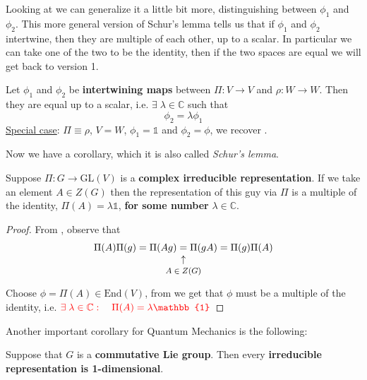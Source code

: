 \documentclass[../main.tex]{subfiles}
\begin{document}
Looking at  we can generalize it a little bit more, distinguishing between $\phi_1$ and $\phi_2$. This more general version of Schur's lemma tells us that if $\phi_1$ and $\phi_2$ intertwine, then they are multiple of each other, up to a scalar. In particular we can take one of the two to be the identity, then if the two spaces are equal we will get back to version 1.
\begin{theorem}
Let $\phi_1$ and $\phi_2$ be \textbf{intertwining maps} between $\Pi:V\to V$ and $\rho:W\to W$. Then they are equal up to a scalar, i.e. $\exists\;\lambda\in\mathbb{C}$ such that
\[
\phi_2=\lambda\phi_1
\]
\underline{Special case}: $\Pi\equiv \rho$, $V=W$, $\phi_1=\mathbb{1}$ and $\phi_2=\phi$, we recover .
\end{theorem}
Now we have a corollary, which it is also called \textit{Schur's lemma}.
\begin{corollary}
Suppose $\Pi:G\to\textrm{GL}(V)$ is a \textbf{complex irreducible representation}. If we take an element $A\in Z(G)$ then the representation of this guy via $\Pi$ is a multiple of the identity, $\Pi(A)=\lambda\mathbb{1}$, \textbf{for some number} $\lambda\in\mathbb{C}$.
\end{corollary}
\begin{proof}
From , observe that 
\[
\Pi(A)\Pi(g)=\Pi(Ag)\underset{\mathclap{\tikz \node {$\uparrow$} node [below=1ex] {\footnotesize $A\in Z(G)$};}}{=}\Pi(gA)=\Pi(g)\Pi(A)
\]
Choose $\phi=\Pi(A)\in\textrm{End}(V)$, from  we get that $\phi$ must be a multiple of the identity, i.e. ${\color{red}\exists\;\lambda\in\mathbb{C}:\quad \Pi(A)=\lambda\mathbb{1}}$
\end{proof}
Another important corollary for Quantum Mechanics is the following:
\begin{corollary}
Suppose that $G$ is a \textbf{commutative Lie group}. Then every \textbf{irreducible representation is 1-dimensional}.
\end{corollary}
\end{document}
